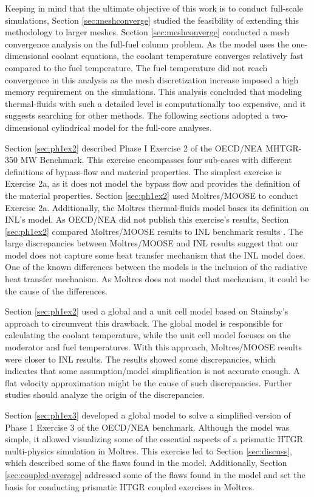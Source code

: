 Keeping in mind that the ultimate objective of this work is to conduct full-scale simulations, Section \ref{sec:meshconverge} studied the feasibility of extending this methodology to larger meshes.
Section \ref{sec:meshconverge} conducted a mesh convergence analysis on the full-fuel column problem.
As the model uses the one-dimensional coolant equations, the coolant temperature converges relatively fast compared to the fuel temperature.
The fuel temperature did not reach convergence in this analysis as the mesh discretization increase imposed a high memory requirement on the simulations.
This analysis concluded that modeling thermal-fluids with such a detailed level is computationally too expensive, and it suggests searching for other methods.
The following sections adopted a two-dimensional cylindrical model for the full-core analyses.

Section \ref{sec:ph1ex2} described Phase I Exercise 2 of the OECD/NEA MHTGR-350 MW Benchmark.
This exercise encompasses four sub-cases with different definitions of bypass-flow and material properties.
The simplest exercise is Exercise 2a, as it does not model the bypass flow and provides the definition of the material properties.
Section \ref{sec:ph1ex2} used Moltres/MOOSE to conduct Exercise 2a.
Additionally, the Moltres thermal-fluids model bases its definition on INL's model.
As OECD/NEA did not publish this exercise’s results, Section \ref{sec:ph1ex2} compared Moltres/MOOSE results to INL benchmark results \cite{strydom_inl_2013}.
The large discrepancies between Moltres/MOOSE and INL results suggest that our model does not capture some heat transfer mechanism that the INL model does.
One of the known differences between the models is the inclusion of the radiative heat transfer mechanism.
As Moltres does not model that mechanism, it could be the cause of the differences.

Section \ref{sec:ph1ex2} used a global and a unit cell model based on Stainsby's approach \cite{stainsby_investigation_2008} to circumvent this drawback.
The global model is responsible for calculating the coolant temperature, while the unit cell model focuses on the moderator and fuel temperatures.
With this approach, Moltres/MOOSE results were closer to INL results.
The results showed some discrepancies, which indicates that some assumption/model simplification is not accurate enough.
A flat velocity approximation might be the cause of such discrepancies.
Further studies should analyze the origin of the discrepancies.

Section \ref{sec:ph1ex3} developed a global model to solve a simplified version of Phase 1 Exercise 3 of the OECD/NEA benchmark.
Although the model was simple, it allowed visualizing some of the essential aspects of a prismatic HTGR multi-physics simulation in Moltres.
This exercise led to Section \ref{sec:discuss}, which described some of the flaws found in the model.
Additionally, Section \ref{sec:coupled-average} addressed some of the flaws found in the model and set the basis for conducting prismatic HTGR coupled exercises in Moltres.
